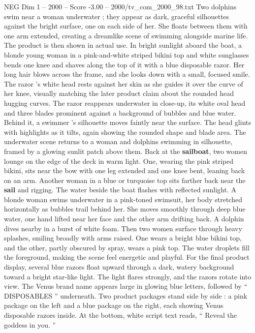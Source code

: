 \begin{textsample}{NEG Dim 1 – 2000 – Score -3.00 – 2000/tv\_com\_2000\_98.txt}
Two dolphins swim near a woman underwater ; they appear as dark, graceful silhouettes against the bright surface, one on each side of her.
She floats between them with one arm extended, creating a dreamlike scene of swimming alongside marine life.
The product is then shown in actual use.
In bright sunlight aboard the boat, a blonde young woman in a pink-and-white striped bikini top and white sunglasses bends one knee and shaves along the top of it with a blue disposable razor.
Her long hair blows across the frame, and she looks down with a small, focused smile.
The razor ’s white head rests against her skin as she guides it over the curve of her knee, visually matching the later product claim about the rounded head hugging curves.
The razor reappears underwater in close-up, its white oval head and three blades prominent against a background of bubbles and blue water.
Behind it, a swimmer ’s silhouette moves faintly near the surface.
The head glints with highlights as it tilts, again showing the rounded shape and blade area.
The underwater scene returns to a woman and dolphins swimming in silhouette, framed by a glowing sunlit patch above them.
Back at the \textbf{sailboat}, two women lounge on the edge of the deck in warm light.
One, wearing the pink striped bikini, sits near the bow with one leg extended and one knee bent, leaning back on an arm.
Another woman in a blue or turquoise top sits farther back near the \textbf{sail} and rigging.
The water beside the boat flashes with reflected sunlight.
A blonde woman swims underwater in a pink-toned swimsuit, her body stretched horizontally as bubbles trail behind her.
She moves smoothly through deep blue water, one hand lifted near her face and the other arm drifting back.
A dolphin dives nearby in a burst of white foam.
Then two women surface through heavy splashes, smiling broadly with arms raised.
One wears a bright blue bikini top, and the other, partly obscured by spray, wears a pink top.
The water droplets fill the foreground, making the scene feel energetic and playful.
For the final product display, several blue razors float upward through a dark, watery background toward a bright star-like light.
The light flares strongly, and the razors rotate into view.
The Venus brand name appears large in glowing blue letters, followed by “ DISPOSABLES ” underneath.
Two product packages stand side by side : a pink package on the left and a blue package on the right, each showing Venus disposable razors inside.
At the bottom, white script text reads, “ Reveal the goddess in you. ”

\end{textsample}
